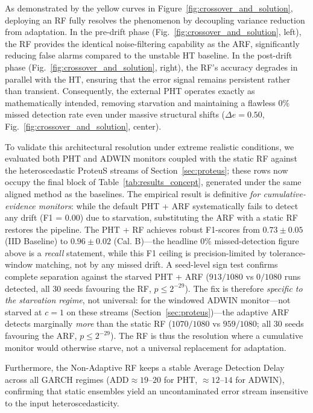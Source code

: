 \documentclass[smallextended]{svjour3}
\begin{document}
As demonstrated by the yellow curves in Figure~\ref{fig:crossover_and_solution}, deploying an RF fully resolves the phenomenon by decoupling variance reduction from adaptation. In the pre-drift phase (Fig.~\ref{fig:crossover_and_solution}, left), the RF provides the identical noise-filtering capability as the ARF, significantly reducing false alarms compared to the unstable HT baseline. In the post-drift phase (Fig.~\ref{fig:crossover_and_solution}, right), the RF's accuracy degrades in parallel with the HT, ensuring that the error signal remains persistent rather than transient. Consequently, the external PHT operates exactly as mathematically intended, removing starvation and maintaining a flawless $0\%$ missed detection rate even under massive structural shifts ($\Delta e = 0.50$, Fig.~\ref{fig:crossover_and_solution}, center).

To validate this architectural resolution under extreme realistic conditions, we evaluated both PHT and ADWIN monitors coupled with the static RF against the heteroscedastic ProteuS streams of Section~\ref{sec:proteus}; these rows now occupy the final block of Table~\ref{tab:results_concept}, generated under the same aligned method as the baselines. The empirical result is definitive \emph{for cumulative-evidence monitors}: while the default PHT + ARF systematically fails to detect any drift (F1 = 0.00) due to starvation, substituting the ARF with a static RF restores the pipeline. The PHT + RF achieves robust F1-scores from $0.73 \pm 0.05$ (IID Baseline) to $0.96 \pm 0.02$ (Cal. B)---the headline $0\%$ missed-detection figure above is a \emph{recall} statement, while this F1 ceiling is precision-limited by tolerance-window matching, not by any missed drift. A seed-level sign test confirms complete separation against the starved PHT + ARF ($913/1080$ vs $0/1080$ runs detected, all $30$ seeds favouring the RF, $p \le 2^{-29}$). The fix is therefore \emph{specific to the starvation regime}, not universal: for the windowed ADWIN monitor---not starved at $c = 1$ on these streams (Section~\ref{sec:proteus})---the adaptive ARF detects marginally \emph{more} than the static RF ($1070/1080$ vs $959/1080$; all $30$ seeds favouring the ARF, $p \le 2^{-29}$). The RF is thus the resolution where a cumulative monitor would otherwise starve, not a universal replacement for adaptation.

Furthermore, the Non-Adaptive RF keeps a stable Average Detection Delay across all GARCH regimes ($\mathrm{ADD} \approx 19$--$20$ for PHT, $\approx 12$--$14$ for ADWIN), confirming that static ensembles yield an uncontaminated error stream insensitive to the input heteroscedasticity.
\end{document}
